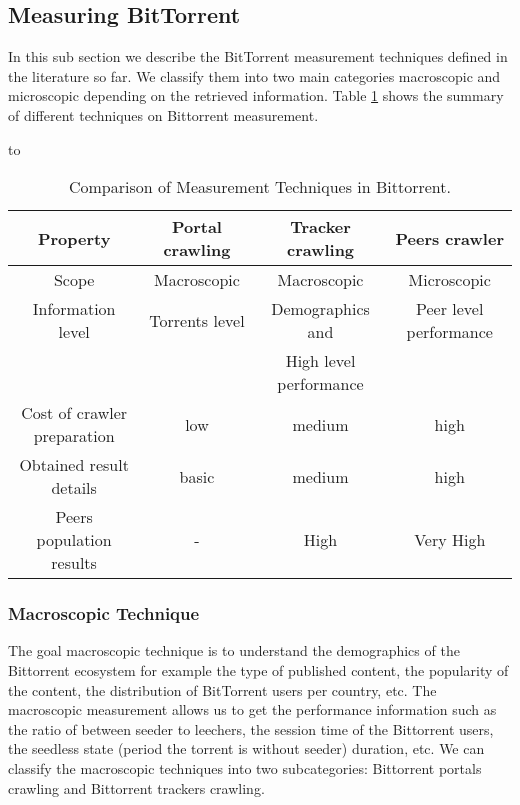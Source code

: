\subsection{Measuring BitTorrent}
In this sub section we describe the BitTorrent measurement techniques defined in the literature so far. 
We classify them into two main categories macroscopic and microscopic depending on the retrieved information. 
Table \ref{tab:measurementtechniques} shows the summary of different techniques on Bittorrent measurement. 

\begin{table}[thb]
\caption{Comparison of Measurement Techniques in Bittorrent.}
\label{tab:measurementtechniques}
\hbox to\hsize{\hfil}
\begin{tabular}{c|c|c|c}\hline\hline
Property & Portal crawling & Tracker crawling & Peers crawler \\ \hline
Scope & Macroscopic & Macroscopic & Microscopic \\ \hline
Information level & Torrents level & Demographics and  & Peer level performance \\ 
 &  & High level performance  & \\ \hline
Cost of crawler preparation & low & medium & high \\ \hline
Obtained result details & basic & medium & high \\ \hline
Peers population results & - & High & Very High \\ \hline
\end{tabular}
\end{table}

\subsubsection{Macroscopic Technique}
The goal macroscopic technique is to understand the demographics of the Bittorrent ecosystem for example the type of published content, the popularity of the content, the distribution of BitTorrent users per country, etc. 
The macroscopic measurement allows us to get the performance information such as the ratio of between seeder to leechers, the session time of the Bittorrent users, the seedless state (period the torrent is without seeder) duration, etc.
We can classify the macroscopic techniques into two subcategories: Bittorrent portals crawling and Bittorrent trackers crawling.

